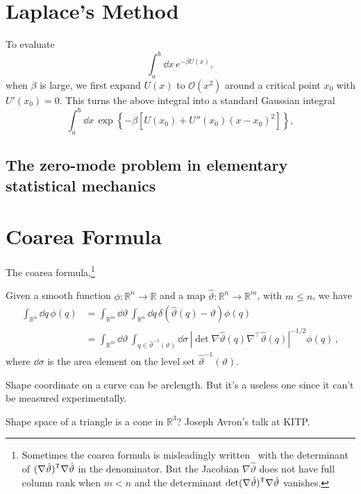\section{Laplace's Method}

To evaluate
%
\begin{equation}
  \int_{a}^{b} \dd{x}\, e^{-\beta U(x)},
\end{equation}
when $\beta$ is large, we first expand $U(x)$ to $\mathcal{O}(x^{2})$ around a critical point $x_{0}$ with $U'(x_{0}) = 0$.
This turns the above integral into a standard Gaussian integral
%
\begin{equation}
  \int_{a}^{b} \dd{x}\, \exp\left\{-\beta\left[U(x_{0}) +  U''(x_{0})(x-x_{0})^{2}\right]\right\},
\end{equation}


\subsection{The zero-mode problem in elementary statistical mechanics}

\section{Coarea Formula}

The coarea formula,\footnote{Sometimes the coarea formula is misleadingly written~\cite{hartmann2007,hartmann2007a} with the determinant of $(\nabla\hat{\vartheta})^\mathsf{T}\nabla\hat{\vartheta}$ in the denominator.  But the Jacobian $\nabla\hat{\vartheta}$ does not have full column rank when $m < n$ and the determinant $\det(\nabla\hat{\vartheta})^\mathsf{T}\nabla\hat{\vartheta}$ vanishes.}
\begin{theorem}
  Given a smooth function $\phi: \mathbb{R}^n \to \mathbb{R}$ and a map $\hat{\vartheta}: \mathbb{R}^n \to \mathbb{R}^m$, with $m \leq n$, we have
  \begin{equation}
    \begin{aligned}
      \int_{\mathbb{R}^n} \dd{q}\, \phi(q) &= \int_{\mathbb{R}^m} \dd{\vartheta}\,\int_{\mathbb{R}^n} \dd{q}\, \delta(\hat{\vartheta}(q) - \vartheta) \phi(q)\\
                                           &= \int_{\mathbb{R}^m} \dd{\vartheta}\,\int_{q \in \hat{\vartheta}^{-1}(\vartheta)} \dd{\sigma}\,|\det \nabla\hat{\vartheta}(q)\nabla^\intercal\hat{\vartheta}(q)|^{-1/2} \phi(q)\,,
    \end{aligned}
  \end{equation}
  where $\dd\sigma$ is the area element on the level set $\hat{\vartheta}^{-1}(\vartheta)$.
\end{theorem}

Shape coordinate on a curve can be arclength.  But it's a useless one since it can't be measured experimentally.

Shape space of a triangle is a cone in $\mathbb{R}^{3}$? Joseph Avron's talk at KITP.

\printpagenotes
